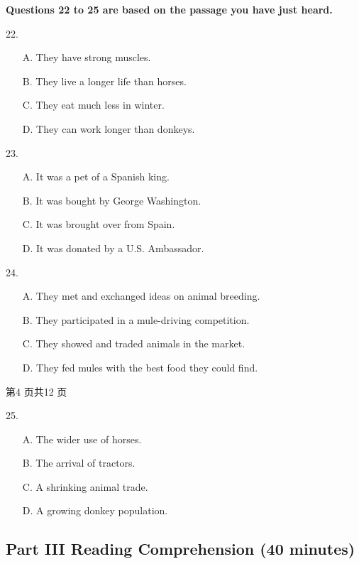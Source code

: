\documentclass[UTF8,11pt]{ctexart}
\begin{document}
\textbf{Questions 22 to 25 are based on the passage you have just heard.}


22.


\begin{itemize}[leftmargin=2em,itemsep=.2em,topsep=.4em]\item[A.] They have strong muscles.
\item[B.] They live a longer life than horses.
\item[C.] They eat much less in winter.
\item[D.] They can work longer than donkeys.
\end{itemize}

23.


\begin{itemize}[leftmargin=2em,itemsep=.2em,topsep=.4em]\item[A.] It was a pet of a Spanish king.
\item[B.] It was bought by George Washington.
\item[C.] It was brought over from Spain.
\item[D.] It was donated by a U.S. Ambassador.
\end{itemize}

24.


\begin{itemize}[leftmargin=2em,itemsep=.2em,topsep=.4em]\item[A.] They met and exchanged ideas on animal breeding.
\item[B.] They participated in a mule-driving competition.
\item[C.] They showed and traded animals in the market.
\item[D.] They fed mules with the best food they could find.
\end{itemize}

第4 页共12 页


25.


\begin{itemize}[leftmargin=2em,itemsep=.2em,topsep=.4em]\item[A.] The wider use of horses.
\item[B.] The arrival of tractors.
\item[C.] A shrinking animal trade.
\item[D.] A growing donkey population.
\end{itemize}

\subsection*{\textbf{Part} III \textbf{Reading Comprehension} \textbf{(40 minutes)}}
\end{document}
